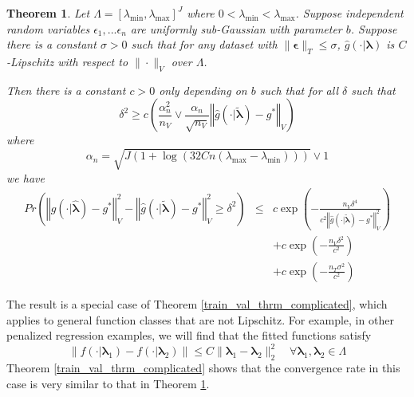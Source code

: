 \documentclass[12pt]{article}
\newtheorem{theorem}{Theorem}
\begin{document}
\begin{theorem}
\label{thrm:train_val}
Let $\Lambda=[\lambda_{\min},\lambda_{\max}]^{J}$ where $0 < \lambda_{\min} < \lambda_{\max}$. Suppose independent random variables $\epsilon_1, ... \epsilon_n$ are uniformly sub-Gaussian with parameter $b$. Suppose there is a constant $\sigma > 0$ such that for any dataset with $\|\boldsymbol{\epsilon}\|_T \le \sigma$, $\hat g (\cdot |\boldsymbol{\lambda} )$ is $C$-Lipschitz with respect to $\| \cdot \|_V$ over $\Lambda$.

Then there is a constant $c>0$ only depending on $b$ such that for all $\delta$ such that
\begin{equation}
\delta^{2}
\ge
c \left ( 
\frac{\alpha_{n}^2}{n_{V}}
\vee 
\frac{\alpha_{n}}{\sqrt{n_{V}}}\left\Vert \hat{g}\left (\cdot | \tilde{\boldsymbol{\lambda}} \right )-g^{*}\right\Vert _{V}
\right )
\end{equation}
where
\begin{equation}
\alpha_n = \sqrt{J \left (1 + \log\left ( 32 C n(\lambda_{\max} - \lambda_{\min}) \right ) \right )} \vee 1
\end{equation}
we have
\begin{eqnarray*}
	Pr\left(
	\left\Vert \hat{g}(\cdot|\hat{\boldsymbol{\lambda}})-g^{*}\right\Vert _{V}^2 -
	\left\Vert \hat{g}(\cdot|\tilde{\boldsymbol{\lambda}})-g^{*}\right\Vert _{V}^2
	\ge\delta^2
	\right )
	&\le& c\exp\left(-\frac{n_{V}\delta^{4}}{c^{2}\left\Vert  \hat{g}(\cdot|\tilde{\boldsymbol{\lambda}})-g^{*}\right\Vert _{V}^{2}}\right) \\
	&& +c\exp\left(-\frac{n_{V}\delta^{2}}{c^{2}}\right) \\
	&& +c\exp\left (
	-\frac{n_T \sigma^2}{c^2}
	\right )
\end{eqnarray*}

\end{theorem}

The result is a special case of Theorem \ref{train_val_thrm_complicated}, which applies to general function classes that are not Lipschitz. For example, in other penalized regression examples, we will find that the fitted functions satisfy
\begin{equation}
\left \| f(\cdot | \boldsymbol \lambda_1) - f(\cdot | \boldsymbol \lambda_2) \right \|
\le
C \| \boldsymbol \lambda_1 - \boldsymbol \lambda_2 \|_2^2
\quad
\forall \boldsymbol \lambda_1,\boldsymbol \lambda_2 \in \Lambda
\label{eq:lipschitz_squared}
\end{equation}
Theorem \ref{train_val_thrm_complicated} shows that the convergence rate in this case is very similar to that in Theorem \ref{thrm:train_val}.
\end{document}
